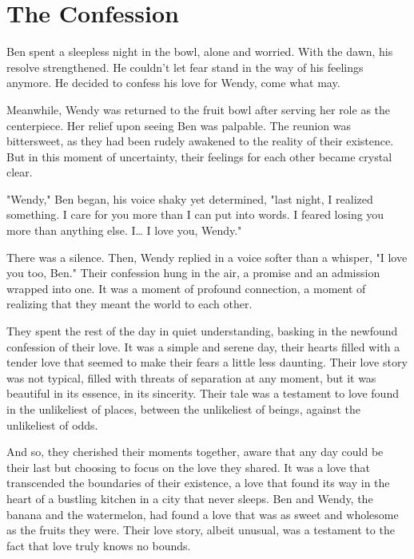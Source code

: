 \section{The Confession}
Ben spent a sleepless night in the bowl, alone and worried. With the dawn, his resolve strengthened. He couldn't let fear stand in the way of his feelings anymore. He decided to confess his love for Wendy, come what may.

Meanwhile, Wendy was returned to the fruit bowl after serving her role as the centerpiece. Her relief upon seeing Ben was palpable. The reunion was bittersweet, as they had been rudely awakened to the reality of their existence. But in this moment of uncertainty, their feelings for each other became crystal clear.

"Wendy," Ben began, his voice shaky yet determined, "last night, I realized something. I care for you more than I can put into words. I feared losing you more than anything else. I… I love you, Wendy."

There was a silence. Then, Wendy replied in a voice softer than a whisper, "I love you too, Ben." Their confession hung in the air, a promise and an admission wrapped into one. It was a moment of profound connection, a moment of realizing that they meant the world to each other.

They spent the rest of the day in quiet understanding, basking in the newfound confession of their love. It was a simple and serene day, their hearts filled with a tender love that seemed to make their fears a little less daunting. Their love story was not typical, filled with threats of separation at any moment, but it was beautiful in its essence, in its sincerity. Their tale was a testament to love found in the unlikeliest of places, between the unlikeliest of beings, against the unlikeliest of odds.

And so, they cherished their moments together, aware that any day could be their last but choosing to focus on the love they shared. It was a love that transcended the boundaries of their existence, a love that found its way in the heart of a bustling kitchen in a city that never sleeps. Ben and Wendy, the banana and the watermelon, had found a love that was as sweet and wholesome as the fruits they were. Their love story, albeit unusual, was a testament to the fact that love truly knows no bounds.
